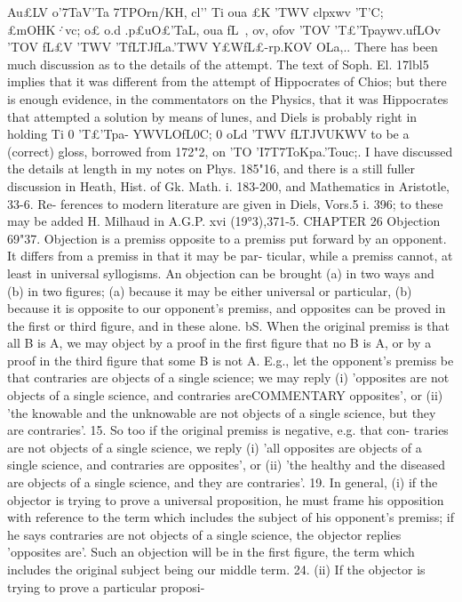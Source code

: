 {{{{{{{{{{{{{{{{{{{{{{{{{{{{Au£LV o'7TaV'Ta 7TPOrn/KH, cl'\A' Ti oua £K 'TWV clpxwv 'T'C; £mOHK\.·vc;
o£
o.d
.p£uO£'TaL, oua
fL~, ov, ofov 'TOV 'T£'Tpaywv.ufLOv 'TOV fL£V
'TWV
'TfLTJfLa.'TWV Y£WfL£-rp.KOV OLa,\vua.. There has been much discussion
as to the details of the attempt. The text of Soph. El. 17lbl5
implies that it was different from the attempt of Hippocrates of
Chios; but there is enough evidence, in the commentators on the
Physics, that it was Hippocrates that attempted a solution by
means of lunes, and Diels is probably right in holding Ti 0 'T£'Tpa-
YWVLOfL0C; 0 oLd 'TWV fLTJV{UKWV to be a (correct) gloss, borrowed
from 172"2, on 'TO 'I7T7ToKpa.'Touc;.
I have discussed the details at length in my notes on Phys.
185"16, and there is a still fuller discussion in Heath, Hist. of
Gk. Math. i. 183-200, and Mathematics in Aristotle, 33-6. Re-
ferences to modern literature are given in Diels, Vors.5 i. 396; to
these may be added H. Milhaud in A.G.P. xvi (19°3),371-5.
CHAPTER 26
Objection
69"37. Objection is a premiss opposite to a premiss put forward
by an opponent. It differs from a premiss in that it may be par-
ticular, while a premiss cannot, at least in universal syllogisms.
An objection can be brought (a) in two ways and (b) in two figures;
(a) because it may be either universal or particular, (b) because
it is opposite to our opponent's premiss, and opposites can be
proved in the first or third figure, and in these alone.
bS. When the original premiss is that all B is A, we may object
by a proof in the first figure that no B is A, or by a proof in the
third figure that some B is not A. E.g., let the opponent's premiss
be that contraries are objects of a single science; we may reply (i)
'opposites are not objects of a single science, and contraries areCOMMENTARY
opposites', or (ii) 'the knowable and the unknowable are not
objects of a single science, but they are contraries'.
15. So too if the original premiss is negative, e.g. that con-
traries are not objects of a single science, we reply (i) 'all opposites
are objects of a single science, and contraries are opposites', or
(ii) 'the healthy and the diseased are objects of a single science,
and they are contraries'.
19. In general, (i) if the objector is trying to prove a universal
proposition, he must frame his opposition with reference to the
term which includes the subject of his opponent's premiss; if he
says contraries are not objects of a single science, the objector
replies 'opposites are'. Such an objection will be in the first
figure, the term which includes the original subject being our
middle term.
24. (ii) If the objector is trying to prove a particular proposi-
}}}}}}}}}}}}}}}}}}}}}}}}}}}}}
